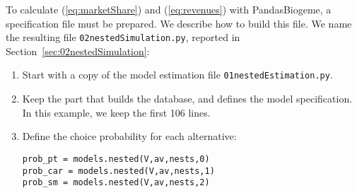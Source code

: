 \documentclass[12pt,a4paper]{article}
\newcommand{\req}[1]{(\ref{#1})}
\begin{document}
To calculate \req{eq:marketShare} and \req{eq:revenues} with
PandasBiogeme, a specification file must be prepared. We describe how
to build this file. We name the resulting file \lstinline$02nestedSimulation.py$,
reported in Section~\ref{sec:02nestedSimulation}:
\begin{enumerate}
\item Start with a copy of the model estimation file
  \lstinline$01nestedEstimation.py$.
\item Keep the part that builds the database, and defines the model
  specification. In this example, we keep the first 106 lines. 
\item Define the choice probability for each alternative:
\begin{lstlisting}
prob_pt = models.nested(V,av,nests,0)
prob_car = models.nested(V,av,nests,1)
prob_sm = models.nested(V,av,nests,2)
\end{lstlisting}


\end{enumerate}
\end{document}
